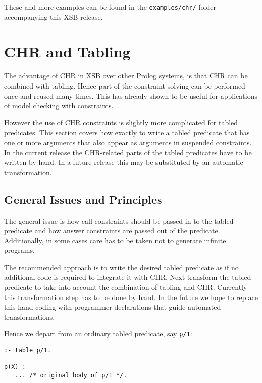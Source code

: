 These and more examples can be found in the \texttt{examples/chr/} folder accompanying
this XSB release.

\section{CHR and Tabling} \label{TCHR}

The advantage of CHR in XSB over other Prolog systems, is that CHR can be
combined with tabling. Hence part of the constraint solving can be performed
once and reused many times. This has already shown to be useful for applications
of model checking with constraints.

However the use of CHR constraints is slightly more complicated for tabled
predicates.  This section covers how exactly to write a tabled
predicate that has one or more arguments that also appear as arguments in
suspended constraints. In the current release the CHR-related parts of the
tabled predicates have to be written by hand. In a future release this may
be substituted by an automatic transformation.

\subsection{General Issues and Principles}

The general issue is how call constraints should be passed in to the tabled
predicate and how answer constraints are passed out of the predicate. Additionally,
in some cases care has to be taken not to generate infinite programs.

The recommended approach is to write the desired tabled predicate as if
no additional code is required to integrate it with CHR.  Next transform
the tabled predicate to take into account the combination of tabling and
CHR. Currently this transformation step has to be done by hand. In the future
we hope to replace this hand coding with programmer declarations that guide
automated transformations.

Hence we depart from an ordinary tabled predicate, say \texttt{p/1}:

\begin{small}
\begin{verbatim}
:- table p/1.

p(X) :- 
   ... /* original body of p/1 */.
\end{verbatim}
\end{small}

